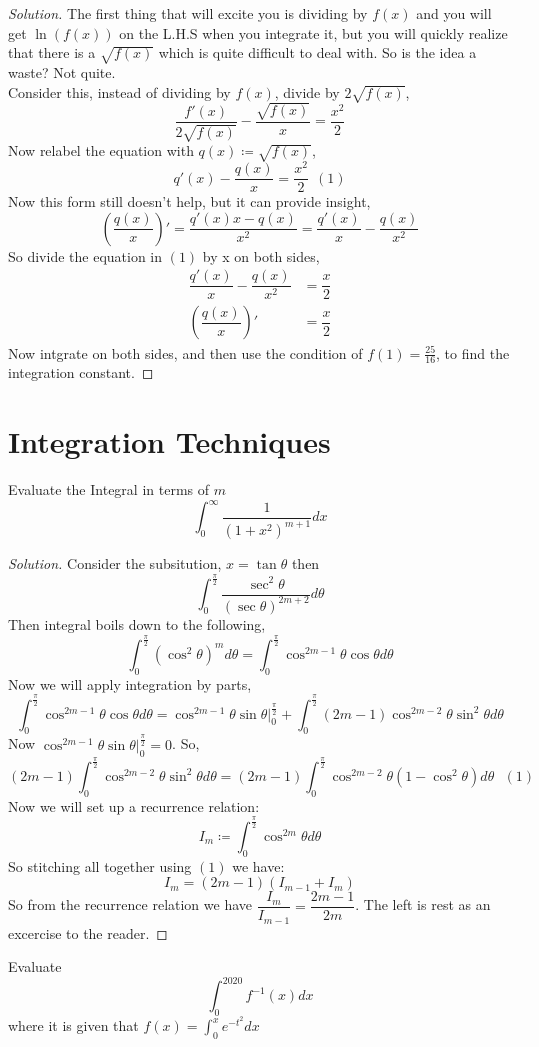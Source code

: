 \documentclass{scrartcl} %
\begin{document}
\begin{proof}[Solution]
The first thing that will excite you is dividing by $f(x)$ and you will get 
$\ln(f(x))$ on the L.H.S when you integrate it, but you will quickly realize that 
there is a $\sqrt{f(x)}$
which is quite difficult to deal with. So is the idea a waste? Not quite.\\
Consider this, instead of dividing by $f(x)$, divide by $2\sqrt{f(x)}$,
\[
	\dfrac{f'(x)}{2\sqrt{f(x)}} - \dfrac{\sqrt{f(x)}}{x} = \dfrac{x^2}{2}
\]
Now relabel the equation with $ q(x) \coloneq \sqrt{f(x)} $, 
\[
	q'(x) - \dfrac{q(x)}{x} = \dfrac{x^2}{2} \ \ (1) 
\]
Now this form still doesn't help, but it can provide insight, 
\[
	\left(\dfrac{q(x)}{x}\right)' = \dfrac{q'(x)x - q(x)}{x^2} =
	\dfrac{q'(x)}{x} - \dfrac{q(x)}{x^2}
\]
So divide the equation in $(1)$ by x on both sides, 
\begin{align*}
	\dfrac{q'(x)}{x} - \dfrac{q(x)}{x^2} &= \dfrac{x}{2} \\
	\left(\dfrac{q(x)}{x}\right)' &= \dfrac{x}{2}
\end{align*}
Now intgrate on both sides, and then use the condition of $f(1) = \frac{25}{16}$, to find the integration constant.
\end{proof}
\newpage

\section{Integration Techniques}
\begin{example}[CMI B3, 2019]
Evaluate the Integral in terms of $m$
\[
	\int_0^\infty \dfrac{1}{\left(1+x^2\right)^{m+1}}dx
\]
\end{example}
\begin{proof}[Solution]
Consider the subsitution, $x = \tan\theta$ then
\[
	\int_0^{\frac{\pi}{2}} \dfrac{\sec^2\theta}{\left(\sec\theta\right)^{2m + 2}}d\theta
\]
Then integral boils down to the following,
\[
	\int_0^{\frac{\pi}{2}}  \left(\cos^2\theta\right)^m d\theta = \int_0^{\frac{\pi}{2}}\cos^{2m - 1}\theta \cos\theta d\theta 
\]
Now we will apply integration by parts,
\[
	\int_0^{\frac{\pi}{2}}\cos^{2m - 1}\theta \cos\theta d\theta  = \cos^{2m - 1}
	\theta \sin\theta\bigg|_0^\frac{\pi}{2} +\int_0^{\frac{\pi}{2}} \left(2m - 1
	\right)\cos^{2m-2}\theta\sin^2\theta d\theta
\]
Now $\cos^{2m - 1}\theta\sin\theta\bigg|_0^\frac{\pi}{2} = 0$. So,
\[
	\left(2m - 1\right)\int_0^{\frac{\pi}{2}} \cos^{2m - 2}\theta\sin^2\theta d\theta = (2m - 1)\int_0^{\frac{
	\pi}{2}} \cos^{2m - 2}\theta\left(1 - \cos^2\theta\right)d\theta \ \ \ (1) 
\]
Now we will set up a recurrence relation:
\[
	I_m \coloneq \int_0^{\frac{\pi}{2}} \cos^{2m}\theta d\theta
\]
So stitching all together using $(1)$ we have:
\[
	I_m = \left(2m - 1\right)\left(I_{m - 1} + I_m \right)
\]
So from the recurrence relation we have $\boxed{\dfrac{I_m}{I_{m - 1}} = \dfrac{2m - 
1}{2m}}$. The left is rest as an excercise to the reader.
\end{proof}
\begin{example}
Evaluate 
\[
	\int_0^{2020} f^{-1}(x) dx
\]
where it is given that $f(x) = \int_0^x e^{-t^2}dx$ 

\end{example}
\end{document}
